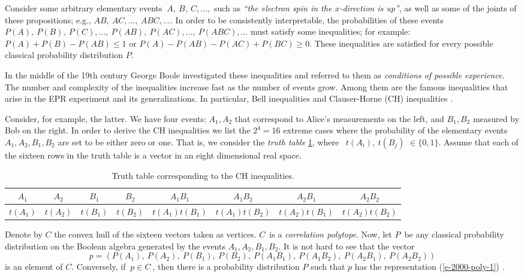 Consider some arbitrary elementary events $\ A,\ B,\ C,\ldots ,$
such as {\em ``the electron spin in the $x$-direction is up''}, as well as
some of the joints of these propositions; e.g.,
$AB,\ AC,\ldots,\ ABC,\ldots $.
In order to be consistently interpretable,
the probabilities of these events\ $P(A),\ P(B),\
P(C),\ldots ,\ P(AB),\ P(AC),\ldots,\ P(ABC),\ldots$
must satisfy some inequalities; for example: $P(A)+P(B)-P(AB)\leq 1$
or  $P(A)-P(AB)-P(AC)+P(BC)\geq 0$.
These inequalities are satisfied  for every
possible classical probability distribution $P$.

In the middle of the 19th century George Boole \cite{Boole,Boole-62,Hailperin,pitowsky,Pit-94}
investigated
these inequalities
and referred to them as {\em conditions of possible experience. }
The number and complexity of the inequalities increase
fast as the number of events grow.
Among
them are the famous
inequalities that arise in the EPR experiment and its generalizations. In
particular,
Bell inequalities and Clauser-Horne (CH) inequalities \cite{bell,clauser}.

Consider, for example, the latter. We have four events: $A_{1},A_{2}$ that
correspond to Alice's
measurements on the left, and $B_{1},B_{2}$ measured by Bob on the right.
In order to derive the
CH inequalities we list the $2^4=16$ extreme cases where the probability of
the
elementary events $A_{1},A_{2},B_{1},B_{2}$ are set to be either zero or
one.
That is,
we consider the {\em truth table} \ref{t-tt-2000-poly},
where \ $t(A_{i}),\ t(B_{j})$ $\in \{0,1\}$. Assume that each of the sixteen
rows in the truth table is
a vector in an eight dimensional real space.
\begin{table}
\caption{Truth table corresponding to the CH inequalities. \label{t-tt-2000-poly}}
\begin{tabular}{cccccccc}
\hline\hline
$A_{1}$ & $A_{2}$ & $B_{1}$ & $B_{2}$&
$A_{1}B_{1}$& $A_{1}B_{2}$ &$A_{2}B_{1}$ & $A_{2}B_{2}$ \\
\hline
$t(A_{1})$ & $t(A_{2})$ & $t(B_{1})$ & $t(B_{2})$&
$t(A_{1})t(B_{1})$& $t(A_{1})t(B_{2})$ & $t(A_{2})t(B_{1})$ & $t(A_{2})t(B_{2})$ \\
\hline\hline
\end{tabular}
\end{table}
Denote by $C$ the convex
hull of the sixteen
vectors taken as vertices. $C$\ is a {\em correlation polytope}. Now, let
$P$\ be any classical probability
distribution on the Boolean algebra generated by the events $
A_{1},A_{2},B_{1},B_{2} $.
It is not hard to
see that the vector
\begin{equation}
p=(P(A_{1}),\ P(A_{2}),\ P(B_{1}),\ P(B_{2}),\ P(A_{1}B_{1}),\
P(A_{1}B_{2}),\ P(A_{2}B_{1}),\ P(A_{2}B_{2}))
\label{e-2000-poly-1}
\end{equation}
is an element of $C$.
Conversely, if $\ p\in C\ $, then there is a
probability distribution $P$ such
that $p$ has the representation (\ref{e-2000-poly-1}) \cite{pitowsky}.

